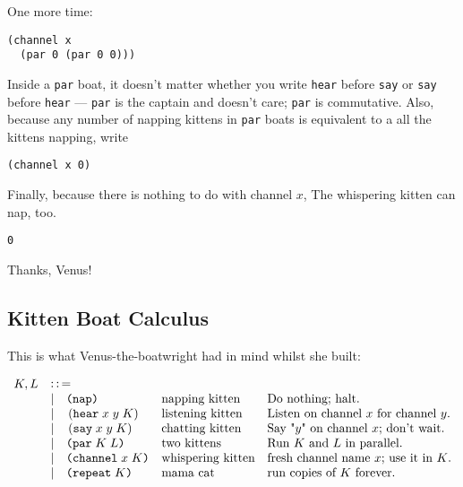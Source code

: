 \documentclass[10pt,oneside,x11names]{article}
\newcommand{\Coloneqq}{\mathrel{\vcenter{\hbox{$:\,:\,=$}}{}}}
\theoremstyle{definition}
\theoremstyle{warning}
\newcommand\say [3]{\left(\texttt{say}\thickspace{}#1\thickspace{}#2\thickspace{}#3\right)}
\newcommand\hear[3]{\left(\texttt{hear}\thickspace{}#1\thickspace{}#2\thickspace{}#3\right)}
\newcommand\knapping    [0]{\texttt{(nap)}}
\newcommand\kpar        [2]{\texttt{(par}\thickspace{}#1\thickspace{}#2\texttt{)}}
\newcommand\kwhispering [2]{\texttt{(channel}\thickspace{}#1\thickspace{}#2\texttt{)}}
\newcommand\kmama       [1]{\texttt{(repeat}\thickspace{}#1\texttt{)}}
\begin{document}
One more time:

\vskip 0.26cm
\begin{verbatim}
(channel x
  (par 0 (par 0 0)))
\end{verbatim}

Inside a \texttt{par} boat, it doesn't matter whether you write
\texttt{hear} before \texttt{say} or \texttt{say} before \texttt{hear} --- \texttt{par} is the
captain and doesn't care; \texttt{par} is commutative. Also, because
any number of napping kittens in \texttt{par} boats is equivalent to
a all the kittens napping, write

\vskip 0.26cm
\begin{verbatim}
(channel x 0)
\end{verbatim}

\newpage
Finally, because there is nothing to do with channel \(x\), The
whispering kitten can nap, too.

\vskip 0.26cm
\begin{verbatim}
0
\end{verbatim}

Thanks, Venus!

\subsection{Kitten Boat Calculus}
\label{sec:org2ed3097}

This is what Venus-the-boatwright had in mind whilst she built:

\begin{equation}
\begin{array}{clll}
  K, L & \Coloneqq \\
       & | \quad \knapping            & \textrm{napping kitten}    & \textrm{Do nothing; halt.}                                   \\
       & | \quad \hear{x}{y}{K}       & \textrm{listening kitten}  & \textrm{Listen on channel }x\textrm{ for channel }y.         \\
       & | \quad \say{x}{y}{K}        & \textrm{chatting kitten}   & \textrm{Say "}y\textrm{" on channel }x\textrm{; don't wait.} \\
       & | \quad \kpar{K}{L}          & \textrm{two kittens}       & \textrm{Run }K\textrm{ and }L\textrm{ in parallel.}          \\
       & | \quad \kwhispering{x}{K}   & \textrm{whispering kitten} & \textrm{fresh channel name }x\textrm{; use it in }K\textrm{.}\\
       & | \quad \kmama{K}            & \textrm{mama cat}          & \textrm{run copies of }K\textrm{ forever}\textrm{.}          \\
\end{array}
\end{equation}
\end{document}
